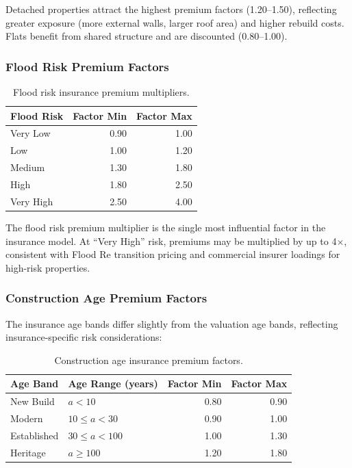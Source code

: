 \documentclass[11pt,a4paper]{article}
\begin{document}
\noindent Detached properties attract the highest premium factors
(1.20--1.50), reflecting greater exposure (more external walls, larger
roof area) and higher rebuild costs. Flats benefit from shared structure
and are discounted (0.80--1.00).

\subsubsection{Flood Risk Premium Factors}

\begin{table}[H]
\centering
\caption{Flood risk insurance premium multipliers.}
\label{tab:flood_premium}
\begin{tabular}{lrr}
\toprule
\textbf{Flood Risk} & \textbf{Factor Min} & \textbf{Factor Max} \\
\midrule
Very Low  & 0.90 & 1.00 \\
Low       & 1.00 & 1.20 \\
Medium    & 1.30 & 1.80 \\
High      & 1.80 & 2.50 \\
Very High & 2.50 & 4.00 \\
\bottomrule
\end{tabular}
\end{table}

\noindent The flood risk premium multiplier is the single most influential
factor in the insurance model. At ``Very High'' risk, premiums may be
multiplied by up to 4$\times$, consistent with Flood Re transition pricing
and commercial insurer loadings for high-risk properties.

\subsubsection{Construction Age Premium Factors}

The insurance age bands differ slightly from the valuation age bands,
reflecting insurance-specific risk considerations:

\begin{table}[H]
\centering
\caption{Construction age insurance premium factors.}
\label{tab:age_premium}
\begin{tabular}{llrr}
\toprule
\textbf{Age Band} & \textbf{Age Range (years)} & \textbf{Factor Min} & \textbf{Factor Max} \\
\midrule
New Build    & $a < 10$        & 0.80 & 0.90 \\
Modern       & $10 \leq a < 30$   & 0.90 & 1.00 \\
Established  & $30 \leq a < 100$  & 1.00 & 1.30 \\
Heritage     & $a \geq 100$       & 1.20 & 1.80 \\
\bottomrule
\end{tabular}
\end{table}
\end{document}
